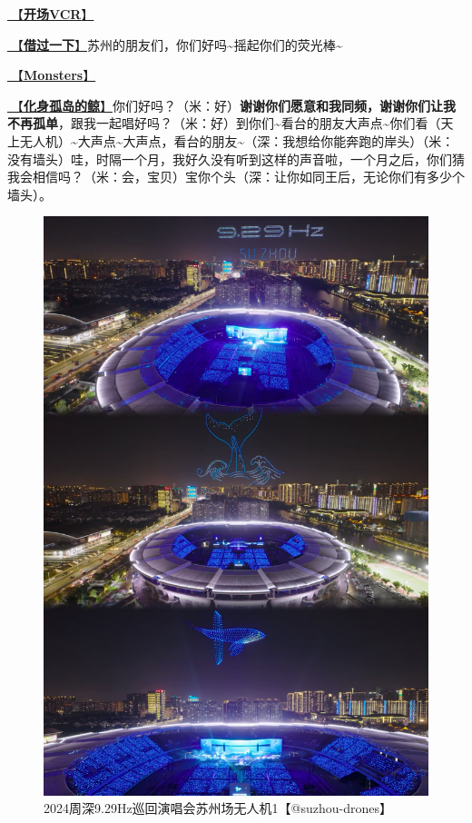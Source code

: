 \documentclass[]{ctexbook}
\begin{document}
\hyperref[opening-vcr]{🎥【\textbf{开场VCR}】}

\hyperref[I-will-go-my-way]{🎵【\textbf{借过一下}】}苏州的朋友们，你们好吗\textasciitilde 摇起你们的荧光棒\textasciitilde{}

\hyperref[Monsters]{🎵【\textbf{Monsters}】}

\hyperref[hua-shen-gu-dao-de-jing]{🎵【\textbf{化身孤岛的鲸}】}你们好吗？（米：好）\textbf{谢谢你们愿意和我同频，谢谢你们让我不再孤单}，跟我一起唱好吗？（米：好）到你们\textasciitilde 看台的朋友大声点\textasciitilde 你们看（天上无人机）\textasciitilde 大声点\textasciitilde 大声点，看台的朋友\textasciitilde（深：我想给你能奔跑的岸头）（米：没有墙头）哇，时隔一个月，我好久没有听到这样的声音啦，一个月之后，你们猜我会相信吗？（米：会，宝贝）宝你个头（深：让你如同王后，无论你们有多少个墙头）。

\begin{figure}

{\centering \includegraphics[width=400pt]{img/suzhou20241109/001} 

}

\caption{2024周深9.29Hz巡回演唱会苏州场无人机1【@suzhou-drones】}\label{fig:unnamed-chunk-125}
\end{figure}
\end{document}
